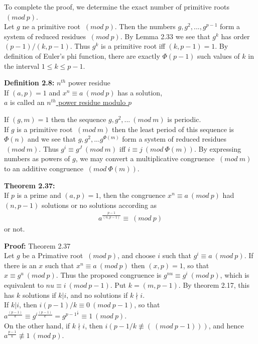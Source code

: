 \documentclass[a4paper]{article}
\begin{document}
To complete the proof, we determine the exact number of primitive roots $\ (mod\ p)$.\\
Let $g$ ne a primitive root $\ (mod\ p)$. Then the numbers $g,g^2,...,g^{p-1}$ form a system of reduced residues $\ (mod\ p)$. By Lemma 2.33 we see that $g^k$ has order $(p-1)/(k,p-1)$. Thus $g^k$ is a primitive root iff $(k,p-1)=1$. By definition of Euler's phi function, there are exactly $\Phi(p-1)$ such values of $k$ in the interval $1\leq k\leq p-1$.

\textbf{Definition 2.8:} $n^{th}$ power residue\\
If $(a,p)=1$ and $x^n \equiv a \ (mod\ p)$ has a solution,\\
$a$ is called an \underline{$n^{th}$ power residue modulo $p$}

If $(g,m)=1$ then the sequence $g,g^2,... \ (mod\ m)$ is periodic.\\
If $g$ is a primitive root $\ (mod\ m)$ then the least period of this sequence is $\Phi(n)$ and we see that $g,g^2,...g^{\Phi(m)}$ form a system of reduced residues $\ (mod\ m)$. Thus $g^i \equiv g^J \ (mod\ m)$ iff $i \equiv j \ (mod\ \Phi(m))$. By expressing numbers as powers of $g$, we may convert a multiplicative congruence $\ (mod\ m)$ to an additive congruence $\ (mod\ \Phi(m))$.

\textbf{Theorem 2.37:}\\
If $p$ is a prime and $(a,p)=1$, then the congruence $x^n \equiv a \ (mod\ p)$ had $(n,p-1)$ solutions or no solutions according as
\begin{align*}
    a^{\frac{p-1}{(n,p-1)}} \equiv \ (mod\ p)
\end{align*}
or not.

\textbf{Proof:} Theorem 2.37\\
Let $g$ be a Primative root $\ (mod\ p)$, and choose $i$ such that $g^i \equiv a \ (mod\ p)$. If there is an $x$ such that $x^n \equiv a \ (mod\ p)$ then $(x,p)=1$, so that $x \equiv  g^u \ (mod\ p)$. Thus the proposed congruence is $g^{nu} \equiv g^i \ (mod\ p)$, which is equivalent to $nu \equiv i \ (mod\ p-1)$. Put $k = (m,p-1)$. By theorem 2.17, this has $k$ solutions if $k|i$, and no solutions if $k\nmid i$.\\
If $k|i$, then $i(p-1)/k \equiv 0 \ (mod\ p-1)$, so that $a^\frac{(p-1)}{k} \equiv g^{i\frac{(p-1)}{k}} = g^{p-1}^{\frac{i}{k}} \equiv 1 \ (mod\ p)$.\\
On the other hand, if $k\nmid i$, then $i(p-1/k \not \equiv (\ (mod\ p-1)))$, and hence $a^{\frac{p-1}{k}}\not \equiv 1 \ (mod\ p)$.
\end{document}
